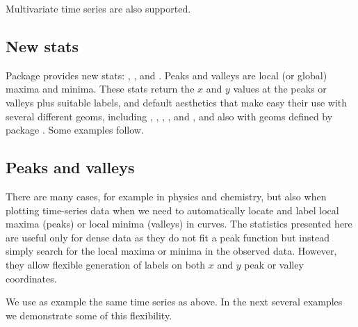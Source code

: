 \documentclass[paper=a4,10pt,div=17,headsepline,BCOR=12mm,twoside,open=right]{scrbook}\usepackage{knitr}
\begin{document}
Multivariate time series are also supported.

\subsection{New stats}

Package \ggpmisc provides new stats: , , and . Peaks and valleys are local (or global) maxima and minima. These stats return the $x$ and $y$ values at the peaks or valleys plus suitable labels, and default aesthetics that make easy their use with several different geoms, including , , , ,  and , and also with geoms defined by package \ggrepel. Some examples follow.

\subsection{Peaks and valleys}

There are many cases, for example in physics and chemistry, but also when plotting time-series data when we need to automatically locate and label local maxima (peaks) or local minima (valleys) in curves. The statistics presented here are useful only for dense data as they do not fit a peak function but instead simply search for the local maxima or minima in the observed data. However, they allow flexible generation of labels on both $x$ and $y$ peak or valley coordinates.

We use as example the same time series as above. In the next several examples we demonstrate some of this flexibility.

\begin{knitrout}\footnotesize
{}\color{fgcolor}\begin{kframe}
\begin{alltt}
 \hlkwb{<-} \hlstd{(} \hlstd{=} \hlstd{(}  \hlstd{=} 
\end{alltt}
\end{kframe}
\end{knitrout}
\end{document}
